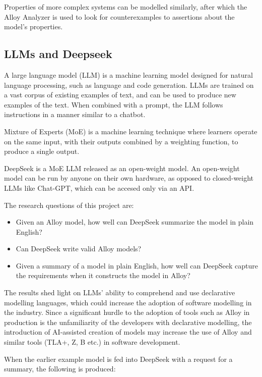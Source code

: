 \documentclass[conference]{IEEEtran}
\begin{document}
Properties of more complex systems can be modelled similarly, after which the Alloy Analyzer is used to look for counterexamples to assertions about the model's properties.


\subsection{LLMs and Deepseek}

A large language model (LLM) is a machine learning model designed for natural language processing, such as language and code generation. LLMs are trained on a vast corpus of existing examples of text, and can be used to produce new examples of the text. When combined with a prompt, the LLM follows instructions in a manner similar to a chatbot.


Mixture of Experts (MoE) is a machine learning technique where learners operate on the same input, with their outputs combined by a weighting function, to produce a single output.

DeepSeek is a MoE LLM released as an open-weight model. An open-weight model can be run by anyone on their own hardware, as opposed to closed-weight LLMs like Chat-GPT, which can be accesed only via an API. 

The research questions of this project are:

\begin{itemize}
    \item Given an Alloy model, how well can DeepSeek summarize the model in plain English?
    \item Can DeepSeek write valid Alloy models?
    \item Given a summary of a model in plain English, how well can DeepSeek capture the requirements when it constructs the model in Alloy?
\end{itemize}

The results shed light on LLMs' ability to comprehend and use declarative modelling languages, which could increase the adoption of software modelling in the industry. Since a significant hurdle to the adoption of tools such as Alloy in production is the unfamiliarity of the developers with declarative modelling, the introduction of AI-assisted creation of models may increase the use of Alloy and similar tools (TLA+, Z, B etc.) in software development.

When the earlier example model is fed into DeepSeek with a request for a summary, the following is produced:
\end{document}
